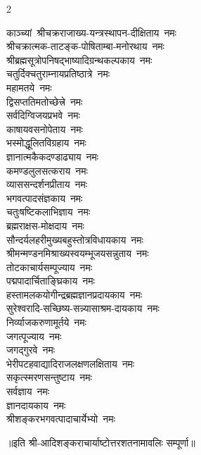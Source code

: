 \begin{multicols}{2}
\begin{flushleft}
काञ्च्यां~श्रीचक्रराजाख्य-यन्त्रस्थापन-दीक्षिताय~नमः\\
श्रीचक्रात्मक-ताटङ्क-पोषिताम्बा-मनोरथाय~नमः\\
श्रीब्रह्मसूत्रोपनिषद्\-भाष्यादि\-ग्रन्थ\-कल्पकाय~नमः\\
चतुर्दिक्चतुराम्नाय\-प्रतिष्ठात्रे~नमः\\
महामतये~नमः\\
द्विसप्ततिमतोच्छेत्त्रे~नमः\\
सर्वदिग्विजयप्रभवे~नमः\\
काषायवसनोपेताय~नमः\\
भस्मोद्धूलितविग्रहाय~नमः\\
ज्ञानात्मकैकदण्डाढ्याय~नमः\hfill{}\\
        
कमण्डलुलसत्कराय~नमः\\
व्याससन्दर्शनप्रीताय~नमः\\
भगवत्पादसंज्ञकाय~नमः\\
चतुःषष्टिकलाभिज्ञाय~नमः\\
ब्रह्मराक्षस-मोक्षदाय~नमः\\
सौन्दर्यलहरी\-मुख्य\-बहु\-स्तोत्र\-विधाय\-काय~नमः\\
श्रीमन्मण्डन\-मिश्राख्य\-स्वयम्भू\-जय\-सन्नुताय~नमः\\
तोटकाचार्यसम्पूज्याय~नमः\\
पद्मपादार्चिताङ्घ्रिकाय~नमः\\
हस्तामलक\-योगीन्द्र\-ब्रह्म\-ज्ञान\-प्रदायकाय~नमः\hfill{}\\

सुरेश्वरादि-सच्छिष्य-सन्न्यासाश्रम-दायकाय~नमः\\
निर्व्याजकरुणामूर्तये~नमः\\
जगत्पूज्याय~नमः\\
जगद्गुरवे~नमः\\
भेरी\-पटह\-वाद्यादि\-राजलक्षण\-लक्षिताय~नमः\\
सकृत्स्मरणसन्तुष्टाय~नमः\\
सर्वज्ञाय~नमः\\
ज्ञानदायकाय~नमः\hfill{}\\
श्रीशङ्करभगवत्\-पादाचार्येभ्यो~नमः\\
                                                                                
    \end{flushleft}
\end{multicols}
॥इति श्री-आदिशङ्कराचार्याष्टोत्तरशतनामावलिः  सम्पूर्णा॥
